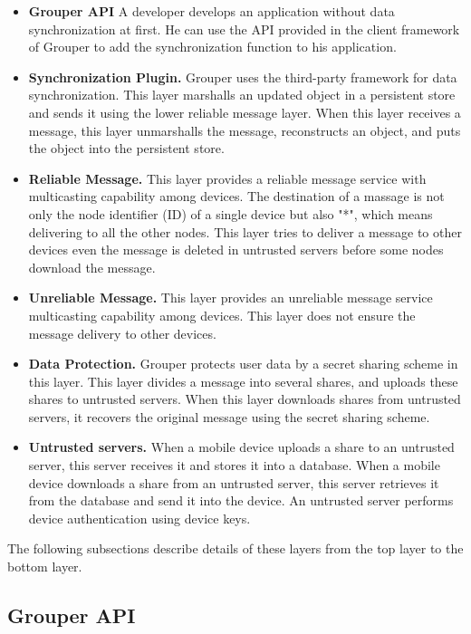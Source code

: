\documentclass[twocolumn,10pt]{article}
\begin{document}
\begin{itemize}
	\setlength{\itemsep}{1pt}
	\setlength{\parskip}{0pt}
	\setlength{\parsep}{0pt}
	\item \textbf{Grouper API}
	A developer develops an application without data synchronization at first. 
	He can use the API provided in the client framework of Grouper to add the synchronization function to his application.
	\item \textbf{Synchronization Plugin.} 
	Grouper uses the third-party framework for data synchronization.
	This layer marshalls an updated object in a persistent store and sends it using the lower reliable message layer.
	When this layer receives a message, this layer unmarshalls the message, reconstructs an object, and puts the object into the persistent store.
	\item \textbf{Reliable Message.}
	This layer provides a reliable message service with multicasting capability among devices.
	The destination of a massage is not only the node identifier (ID) of a single device but also "*", which means delivering to all the other nodes.
	This layer tries to deliver a message to other devices even the message is deleted in untrusted servers before some nodes download the message.
	\item \textbf{Unreliable Message.}
	This layer provides an unreliable message service multicasting capability among devices.
	This layer does not ensure the message delivery to other devices.
	\item \textbf{Data Protection.}
	Grouper protects user data by a secret sharing scheme in this layer.
	This layer divides a message into several shares, and uploads these shares to untrusted servers.
	When this layer downloads shares from untrusted servers, it recovers the original message using the secret sharing scheme.
	\item \textbf{Untrusted servers.}
	When a mobile device uploads a share to an untrusted server, this server receives it and stores it into a database.
	When a mobile device downloads a share from an untrusted server, this server retrieves it from the database and send it into the device.
	An untrusted server performs device authentication using device keys.
\end{itemize}

The following subsections describe details of these layers from the top layer to the bottom layer.

\subsection{Grouper API}
\end{document}
